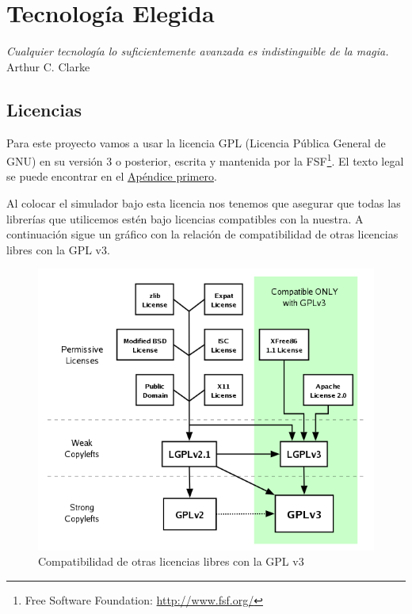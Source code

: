 \chapter*{Tecnología Elegida} \label{cap4}

\begin{flushright}
\begin{minipage}{7.85cm}
    {\em Cualquier tecnología lo suficientemente avanzada es indistinguible de
    la magia.} \\ Arthur C. Clarke
\end{minipage}
\end{flushright}

\vspace*{5mm}

\section*{Licencias}

Para este proyecto vamos a usar la licencia GPL (Licencia Pública General de
GNU) en su versión 3 o posterior, escrita y mantenida por la FSF\footnote{Free
Software Foundation: \url{http://www.fsf.org/}}. El texto legal se puede
encontrar en el \hyperref[ap1]{Apéndice primero}.

Al colocar el simulador bajo esta licencia nos tenemos que asegurar que todas
las librerías que utilicemos estén bajo licencias compatibles con la nuestra. A
continuación sigue un gráfico con la relación de compatibilidad de otras
licencias libres con la GPL v3.

\begin{figure}[H]
 \centering
 \includegraphics[width=120mm]{figuras/cap4/gplv3_comp.png}
 \caption{Compatibilidad de otras licencias libres con la GPL v3}
\end{figure}

